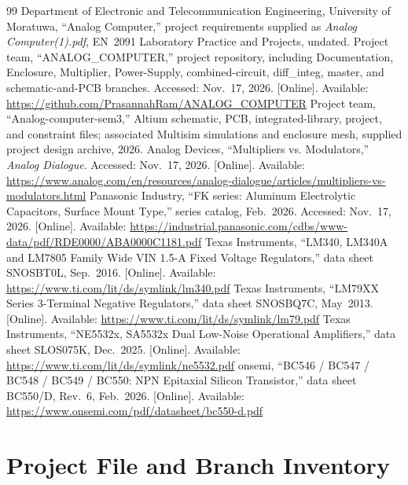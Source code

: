 \documentclass[11pt,a4paper]{article}
\begin{document}
\clearpage
{}
\begin{thebibliography}{99}
Department of Electronic and Telecommunication Engineering, University of Moratuwa, ``Analog Computer,'' project requirements supplied as \textit{Analog Computer(1).pdf}, EN~2091 Laboratory Practice and Projects, undated.
Project team, ``ANALOG\_COMPUTER,'' project repository, including Documentation, Enclosure, Multiplier, Power-Supply, combined-circuit, diff\_integ, master, and schematic-and-PCB branches. Accessed: Nov.~17, 2026. [Online]. Available: \url{https://github.com/PrasannahRam/ANALOG_COMPUTER}
Project team, ``Analog-computer-sem3,'' Altium schematic, PCB, integrated-library, project, and constraint files; associated Multisim simulations and enclosure mesh, supplied project design archive, 2026.
Analog Devices, ``Multipliers vs. Modulators,'' \textit{Analog Dialogue}. Accessed: Nov.~17, 2026. [Online]. Available: \url{https://www.analog.com/en/resources/analog-dialogue/articles/multipliers-vs-modulators.html}
Panasonic Industry, ``FK series: Aluminum Electrolytic Capacitors, Surface Mount Type,'' series catalog, Feb.~2026. Accessed: Nov.~17, 2026. [Online]. Available: \url{https://industrial.panasonic.com/cdbs/www-data/pdf/RDE0000/ABA0000C1181.pdf}
Texas Instruments, ``LM340, LM340A and LM7805 Family Wide VIN 1.5-A Fixed Voltage Regulators,'' data sheet SNOSBT0L, Sep.~2016. [Online]. Available: \url{https://www.ti.com/lit/ds/symlink/lm340.pdf}
Texas Instruments, ``LM79XX Series 3-Terminal Negative Regulators,'' data sheet SNOSBQ7C, May~2013. [Online]. Available: \url{https://www.ti.com/lit/ds/symlink/lm79.pdf}
Texas Instruments, ``NE5532x, SA5532x Dual Low-Noise Operational Amplifiers,'' data sheet SLOS075K, Dec.~2025. [Online]. Available: \url{https://www.ti.com/lit/ds/symlink/ne5532.pdf}
onsemi, ``BC546 / BC547 / BC548 / BC549 / BC550: NPN Epitaxial Silicon Transistor,'' data sheet BC550/D, Rev.~6, Feb.~2026. [Online]. Available: \url{https://www.onsemi.com/pdf/datasheet/bc550-d.pdf}
\end{thebibliography}

\clearpage
\appendix
\section{Project File and Branch Inventory}
\label{app:inventory}
\end{document}
